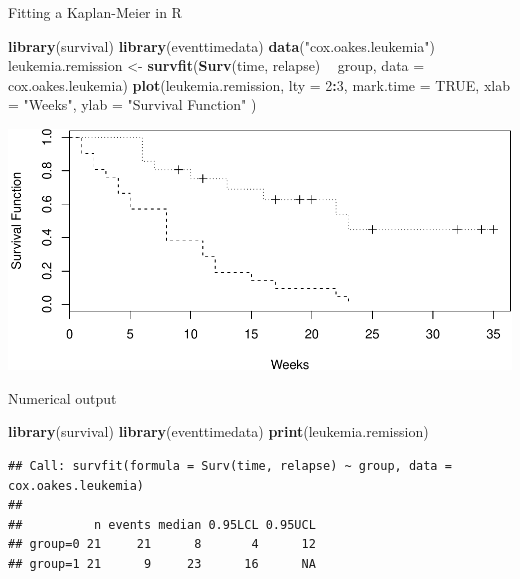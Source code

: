 \documentclass[ignorenonframetext,]{beamer}
\newenvironment{Shaded}{\begin{snugshade}}{\end{snugshade}}
\newcommand{\DataTypeTok}[1]{\textcolor[rgb]{0.13,0.29,0.53}{#1}}
\newcommand{\DecValTok}[1]{\textcolor[rgb]{0.00,0.00,0.81}{#1}}
\newcommand{\KeywordTok}[1]{\textcolor[rgb]{0.13,0.29,0.53}{\textbf{#1}}}
\newcommand{\NormalTok}[1]{#1}
\newcommand{\OperatorTok}[1]{\textcolor[rgb]{0.81,0.36,0.00}{\textbf{#1}}}
\newcommand{\OtherTok}[1]{\textcolor[rgb]{0.56,0.35,0.01}{#1}}
\newcommand{\StringTok}[1]{\textcolor[rgb]{0.31,0.60,0.02}{#1}}
\begin{document}
\begin{frame}[fragile]{%
\protect\hypertarget{fitting-a-kaplan-meier-in-r}{%
Fitting a Kaplan-Meier in R}}

\scriptsize

\begin{Shaded}
\begin{Highlighting}[]
\KeywordTok{library}\NormalTok{(survival)}
\KeywordTok{library}\NormalTok{(eventtimedata)}
\KeywordTok{data}\NormalTok{(}\StringTok{"cox.oakes.leukemia"}\NormalTok{)}
\NormalTok{leukemia.remission <-}\StringTok{ }\KeywordTok{survfit}\NormalTok{(}\KeywordTok{Surv}\NormalTok{(time, relapse) }\OperatorTok{~}\StringTok{ }\NormalTok{group, }
                              \DataTypeTok{data =}\NormalTok{ cox.oakes.leukemia)}
\KeywordTok{plot}\NormalTok{(leukemia.remission, }\DataTypeTok{lty =} \DecValTok{2}\OperatorTok{:}\DecValTok{3}\NormalTok{, }\DataTypeTok{mark.time =} \OtherTok{TRUE}\NormalTok{, }\DataTypeTok{xlab =} \StringTok{"Weeks"}\NormalTok{, }
     \DataTypeTok{ylab =} \StringTok{"Survival Function"}\NormalTok{ )}
\end{Highlighting}
\end{Shaded}

\includegraphics{unit_02_estimation_files/figure-beamer/unnamed-chunk-1-1.pdf}

\end{frame}

\begin{frame}[fragile]{%
\protect\hypertarget{numerical-output}{%
Numerical output}}

\footnotesize

\begin{Shaded}
\begin{Highlighting}[]
\KeywordTok{library}\NormalTok{(survival)}
\KeywordTok{library}\NormalTok{(eventtimedata)}
\KeywordTok{print}\NormalTok{(leukemia.remission)}
\end{Highlighting}
\end{Shaded}

\begin{verbatim}
## Call: survfit(formula = Surv(time, relapse) ~ group, data = cox.oakes.leukemia)
## 
##          n events median 0.95LCL 0.95UCL
## group=0 21     21      8       4      12
## group=1 21      9     23      16      NA
\end{verbatim}

\end{frame}
\end{document}

